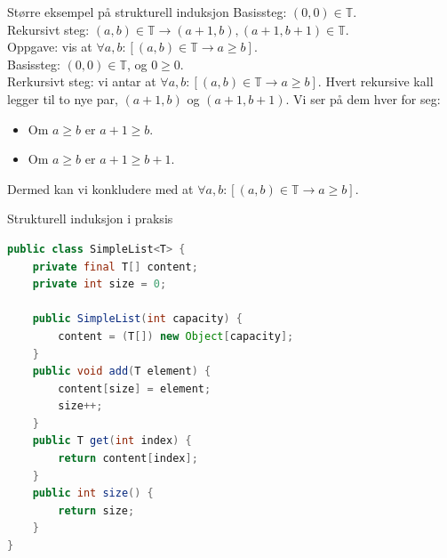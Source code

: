 \begin{frame}{Større eksempel på strukturell induksjon}
    Basissteg: $(0, 0) \in \mathbb{T}$.\\
    Rekursivt steg: $(a, b) \in \mathbb{T} \rightarrow (a+1, b), (a+1, b+1) \in \mathbb{T}$.\\
    
    Oppgave: vis at $\forall a, b : [(a, b) \in \mathbb{T} \rightarrow a \geq b]$.\\
    
    \pause
    Basissteg: $(0, 0) \in \mathbb{T}$, og $0 \geq 0$. \checkmark\\
    Rerkursivt steg: vi antar at $\forall a, b : [(a, b) \in \mathbb{T} \rightarrow a \geq b]$. Hvert rekursive kall legger til to nye par, $(a+1, b)$ og $(a+1, b+1)$. Vi ser på dem hver for seg:
    \begin{itemize}
        \item Om $a \geq b$ er $a+1 \geq b$.
        \item Om $a \geq b$ er $a+1 \geq b+1$. \checkmark
    \end{itemize}
    Dermed kan vi konkludere med at $\forall a, b : [(a, b) \in \mathbb{T} \rightarrow a \geq b]$.
\end{frame}

\begin{frame}[fragile]{Strukturell induksjon i praksis}
    \begin{lstlisting}[language=Java]
public class SimpleList<T> {
    private final T[] content;
    private int size = 0;

    public SimpleList(int capacity) {
        content = (T[]) new Object[capacity];
    }
    public void add(T element) {
        content[size] = element;
        size++;
    }
    public T get(int index) { 
        return content[index]; 
    }
    public int size() { 
        return size; 
    }
}
    \end{lstlisting}
\end{frame}
